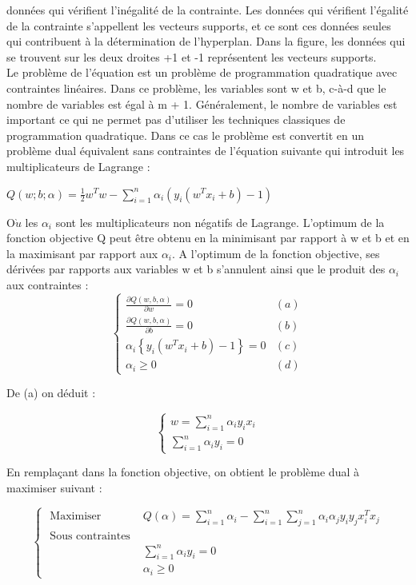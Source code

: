 \documentclass[12pt,a4paper]{report}
\begin{document}
données qui vérifient l’inégalité de la contrainte. Les données qui vérifient l’égalité de la contrainte s’appellent les vecteurs supports, et ce sont ces données seules qui contribuent
à la détermination de l’hyperplan. Dans la figure, les données qui se trouvent sur les deux
droites +1 et -1 représentent les vecteurs supports.\\
Le problème de l’équation est un problème de programmation quadratique avec contraintes
linéaires. Dans ce problème, les variables sont w et b, c-à-d que le nombre de variables est
égal à m + 1. Généralement, le nombre de variables est important ce qui ne permet pas
d’utiliser les techniques classiques de programmation quadratique. Dans ce cas le problème
est convertit en un problème dual équivalent sans contraintes de l’équation suivante qui
introduit les multiplicateurs de Lagrange :\begin{center}
	$ Q(w; b;\alpha ) =\frac{1}{2}w^{T}w - \sum_{i=1}^{n}\alpha_{i}(y_{i}(w^{T} x_{i} + b) - 1) $
\end{center}
O$\grave{u}$ les $\alpha_{i}$ sont les multiplicateurs non négatifs de Lagrange. L’optimum de la fonction
objective Q peut être obtenu en la minimisant par rapport à w et b et en la maximisant
par rapport aux $\alpha_{i}$. A l’optimum de la fonction objective, ses dérivées par rapports aux
variables w et b s'annulent ainsi que le produit des $\alpha_{i}$ aux contraintes :
$$
\begin{cases}\frac{\partial Q(w, b, \alpha)}{\partial w}=0 & (a) \\ \frac{\partial Q(w, b, \alpha)}{\partial b}=0 & (b) \\ \alpha_{i}\left\{y_{i}\left(w^{T} x_{i}+b\right)-1\right\}=0 & (c) \\ \alpha_{i} \geq 0 & (d)\end{cases}
$$

De (a) on déduit :

$$
\left\{\begin{array}{l}
	w=\sum_{i=1}^{n} \alpha_{i} y_{i} x_{i} \\
	\sum_{i=1}^{n} \alpha_{i} y_{i}=0
\end{array}\right.
$$

En remplaçant dans la fonction objective, on obtient le problème dual à maximiser suivant :

$$
\begin{cases}\text { Maximiser } & Q(\alpha)=\sum_{i=1}^{n} \alpha_{i}-\sum_{i=1}^{n} \sum_{j=1}^{n} \alpha_{i} \alpha_{j} y_{i} y_{j} x_{i}^{T} x_{j} \\ \text { Sous contraintes } & \\ & \sum_{i=1}^{n} \alpha_{i} y_{i}=0 \\ & \alpha_{i} \geq 0\end{cases}
$$
\end{document}
